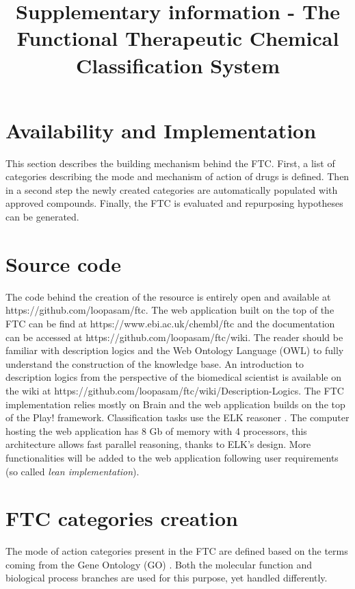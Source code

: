 \documentclass{bioinfo}
\begin{document}

\title[Supplementary information - The Functional Therapeutic Chemical Classification System]{Supplementary information - 
The Functional Therapeutic Chemical Classification System}

\section*{Availability and Implementation}

This section describes the building mechanism behind the FTC. 
First, a list of categories describing the mode and mechanism of action of drugs is defined. 
Then in a second step the newly created categories are automatically populated with approved compounds. 
Finally, the FTC is evaluated and repurposing hypotheses can be generated.

\section{Source code}
The code behind the creation of the resource is entirely open and available 
at {{https://github.com/loopasam/ftc}}. The web application built on the top of the 
FTC can be find at {{https://www.ebi.ac.uk/chembl/ftc}} and the documentation can be 
accessed at {{https://github.com/loopasam/ftc/wiki}}. The reader should be familiar with 
description logics and the Web Ontology Language (OWL) to fully understand the construction of the 
knowledge base. An introduction to description logics from the perspective of the biomedical scientist is 
available on the wiki at {{https://github.com/loopasam/ftc/wiki/Description-Logics}}. The FTC implementation 
relies mostly on Brain \citep{Croset2013} and the web application builds on the top of the Play! framework. 
Classification tasks use the ELK reasoner \citep{Kazakov2011}. The computer hosting the web application has 8 Gb of memory 
with 4 processors, this architecture allows fast parallel reasoning, thanks to ELK's design. More functionalities 
will be added to the web application following user requirements (so called \emph{lean implementation}).

\section{FTC categories creation}
The mode of action categories present in the FTC are defined based on the terms coming from the 
Gene Ontology (GO) \citep{Ashburner2000}. Both the molecular function and biological process branches are used for 
this purpose, yet handled differently.
\end{document}
